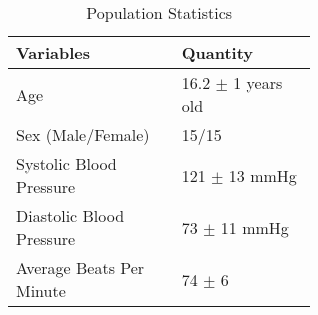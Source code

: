 \documentclass[
	a4paper, 
	10pt, 
	twoside, 
]{LTJournalArticle}
\begin{document}
\begin{table*} [!h]
	\caption{Population Statistics}
        \label{tab:pop}
	\centering 
	\begin{tabular}{L{0.3\linewidth} L{0.3\linewidth}} 
		\toprule
		  Variables & Quantity \\
		\midrule
		Age & 16.2 $\pm$ 1 years old\\
            Sex (Male/Female) & 15/15 \\
            Systolic Blood Pressure & 121 $\pm$ 13 mmHg \\
            Diastolic Blood Pressure & 73 $\pm$ 11 mmHg \\
            Average Beats Per Minute & 74 $\pm$ 6 \\
		\bottomrule
	\end{tabular}
\end{table*}
\end{document}
